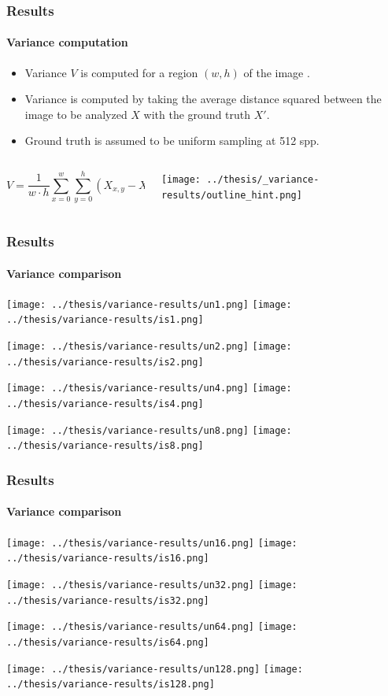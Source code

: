 \documentclass{beamer}
\begin{document}
   \begin{frame}
    \frametitle{Results}
    \framesubtitle{Variance computation}

	\begin{itemize}
    \item Variance $V$ is computed for a region $(w,h)$ of the image .
	\item Variance is computed by taking the average distance squared between the image to be analyzed $X$ with the ground truth $X'$.
	\item Ground truth is assumed to be uniform sampling at 512 spp.
	\end{itemize}
	
	\begin{columns}
    \begin{column}{0.65\textwidth}
	\begin{equation}
	V = \frac{1}{w\cdot h} \sum_{x=0}^w \sum_{y=0}^h (X_{x,y} - X'_{x,y})^2
	\end{equation}		
	\end{column}
	\begin{column}{0.35\textwidth}
	\texttt{[image: ../thesis/\_variance-results/outline\_hint.png]}
	\end{column}
	\end{columns}
    
    \end{frame}
  
  
  
  \begin{frame}
    \frametitle{Results}
    \framesubtitle{Variance comparison}
    \centering
    
    \texttt{[image: ../thesis/variance-results/un1.png]} 
    \texttt{[image: ../thesis/variance-results/is1.png]}
    
    \texttt{[image: ../thesis/variance-results/un2.png]} 
    \texttt{[image: ../thesis/variance-results/is2.png]}
    
    \texttt{[image: ../thesis/variance-results/un4.png]} 
    \texttt{[image: ../thesis/variance-results/is4.png]}
    
    \texttt{[image: ../thesis/variance-results/un8.png]} 
    \texttt{[image: ../thesis/variance-results/is8.png]}
   

  \end{frame}
  
  \begin{frame}
    \frametitle{Results}
    \framesubtitle{Variance comparison}
    \centering

    \texttt{[image: ../thesis/variance-results/un16.png]} 
    \texttt{[image: ../thesis/variance-results/is16.png]}
        
    \texttt{[image: ../thesis/variance-results/un32.png]} 
    \texttt{[image: ../thesis/variance-results/is32.png]}
    
    \texttt{[image: ../thesis/variance-results/un64.png]} 
    \texttt{[image: ../thesis/variance-results/is64.png]}
    
    \texttt{[image: ../thesis/variance-results/un128.png]} 
    \texttt{[image: ../thesis/variance-results/is128.png]}
    
  \end{frame}
  
\end{document}
